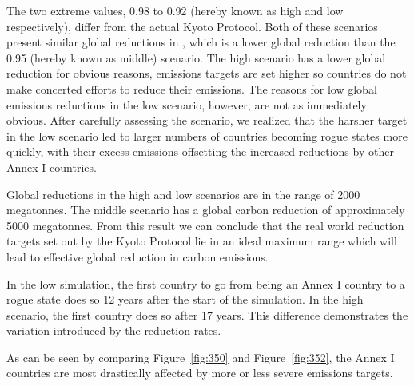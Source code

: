 The two extreme values, 0.98 to 0.92 (hereby known as high and low respectively), differ from the actual Kyoto Protocol. Both of these scenarios present similar global reductions in \CO, which is a lower global reduction than the 0.95 (hereby known as middle) scenario. The high scenario has a lower global reduction for obvious reasons, emissions targets are set higher so countries do not make concerted efforts to reduce their \CO emissions. The reasons for low global emissions reductions in the low scenario, however, are not as immediately obvious. After carefully assessing the scenario, we realized that the harsher target in the low scenario led to larger numbers of countries becoming rogue states more quickly, with their excess emissions offsetting the increased reductions by other Annex I countries.

Global reductions in the high and low scenarios are in the range of 2000 megatonnes. The middle scenario has a global carbon reduction of approximately 5000 megatonnes. From this result we can conclude that the real world reduction targets set out by the Kyoto Protocol lie in an ideal maximum range which will lead to effective global reduction in carbon emissions.

In the low simulation, the first country to go from being an Annex I country to a rogue state does so 12 years after the start of the simulation. In the high scenario, the first country does so after 17 years. This difference demonstrates the variation introduced by the reduction rates.

As can be seen by comparing Figure~\ref{fig:350} and Figure~\ref{fig:352}, the Annex I countries are most drastically affected by more or less severe emissions targets.

